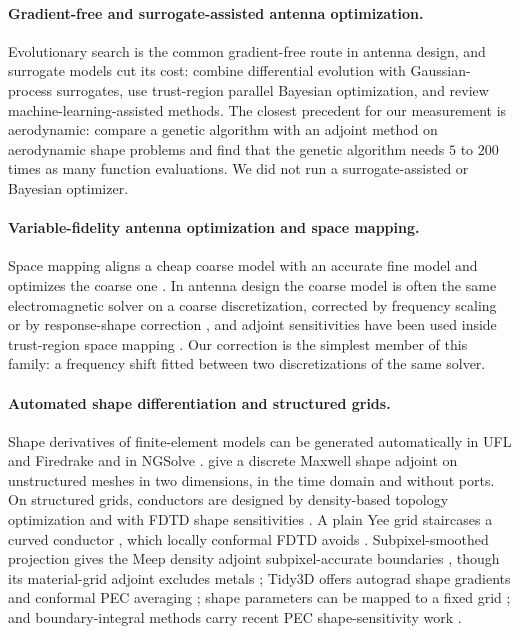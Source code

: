 \documentclass{anvil-paper}
\begin{document}
\paragraph{Gradient-free and surrogate-assisted antenna optimization.}
Evolutionary search is the common gradient-free route in antenna design, and
surrogate models cut its cost: \citet{liu2014efficient} combine differential
evolution with Gaussian-process surrogates, \citet{zhou2021trust} use
trust-region parallel Bayesian optimization, and \citet{akinsolu2020machine}
review machine-learning-assisted methods. The closest precedent for our
measurement is aerodynamic: \citet{zingg2008comparative} compare a genetic
algorithm with an adjoint method on aerodynamic shape problems and find that the
genetic algorithm needs $5$ to $200$ times as many function evaluations. We
did not run a surrogate-assisted or Bayesian optimizer.

\paragraph{Variable-fidelity antenna optimization and space mapping.}
Space mapping aligns a cheap coarse model with an accurate fine model and
optimizes the coarse one \citep{bandler1994space,bandler2004space,koziel2006framework}.
In antenna design the coarse model is often the same electromagnetic solver
on a coarse discretization, corrected by frequency scaling or by
response-shape correction \citep{koziel2010sprp,koziel2014antenna}, and
adjoint sensitivities have been used inside trust-region space mapping
\citep{koziel2013reliable}. Our correction is the simplest member of this
family: a frequency shift fitted between two discretizations of the same
solver.

\paragraph{Automated shape differentiation and structured grids.}
Shape derivatives of finite-element models can be generated automatically in
UFL and Firedrake \citep{ham2019automated,dokken2020,paganini2021fireshape}
and in NGSolve \citep{gangl2021fully}. \citet{wang2011} give a discrete
Maxwell shape adjoint on unstructured meshes in two dimensions, in the time
domain and without ports. On structured grids, conductors are designed by
density-based topology optimization
\citep{erentok2011topology,hassan2014topology,hassan2014patch} and with FDTD
shape sensitivities \citep{nikolova2004sensitivity,nikolova2006scattering}.
A plain Yee grid staircases a curved conductor
\citep{cangellaris1991analysis,haggblad2014accuracy}, which locally
conformal FDTD avoids
\citep{dey1997locally,mittra2000conformal,zagorodnov2003uniformly,benkler2006new}.
Subpixel-smoothed projection gives the Meep density adjoint
subpixel-accurate boundaries \citep{hammond2025unifying,romano2026ssp2},
though its material-grid adjoint excludes metals \citep{meepadjointdocs};
Tidy3D offers autograd shape gradients and conformal PEC averaging
\citep{tidy3dautograd}; shape parameters can be mapped to a fixed grid
\citep{hooten2025,liu2024imagerep}; and boundary-integral methods carry
recent PEC shape-sensitivity work
\citep{takahashi2025tdbie,arens2026tubular,balouchev2024balun}.
\end{document}
